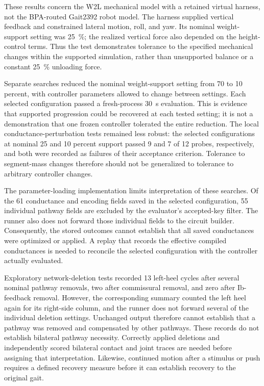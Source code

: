 These results concern the W2L mechanical model with a retained virtual harness, not the BPA-routed Gait2392 robot model. The harness supplied vertical feedback and constrained lateral motion, roll, and yaw. Its nominal weight-support setting was \qty{25}{\percent}; the realized vertical force also depended on the height-control terms. Thus the test demonstrates tolerance to the specified mechanical changes within the supported simulation, rather than unsupported balance or a constant \qty{25}{\percent} unloading force.

Separate searches reduced the nominal weight-support setting from 70 to 10 percent, with controller parameters allowed to change between settings. Each selected configuration passed a fresh-process \qty{30}{\second} evaluation. This is evidence that supported progression could be recovered at each tested setting; it is not a demonstration that one frozen controller tolerated the entire reduction. The local conductance-perturbation tests remained less robust: the selected configurations at nominal 25 and 10 percent support passed 9 and 7 of 12 probes, respectively, and both were recorded as failures of their acceptance criterion. Tolerance to segment-mass changes therefore should not be generalized to tolerance to arbitrary controller changes.

The parameter-loading implementation limits interpretation of these searches. Of the 61 conductance and encoding fields saved in the selected configuration, 55 individual pathway fields are excluded by the evaluator's accepted-key filter. The runner also does not forward those individual fields to the circuit builder. Consequently, the stored outcomes cannot establish that all saved conductances were optimized or applied. A replay that records the effective compiled conductances is needed to reconcile the selected configuration with the controller actually evaluated.

Exploratory network-deletion tests recorded 13 left-heel cycles after several nominal pathway removals, two after commissural removal, and zero after Ib-feedback removal. However, the corresponding summary counted the left heel again for its right-side column, and the runner does not forward several of the individual deletion settings. Unchanged output therefore cannot establish that a pathway was removed and compensated by other pathways. These records do not establish bilateral pathway necessity. Correctly applied deletions and independently scored bilateral contact and joint traces are needed before assigning that interpretation. Likewise, continued motion after a stimulus or push requires a defined recovery measure before it can establish recovery to the original gait.

